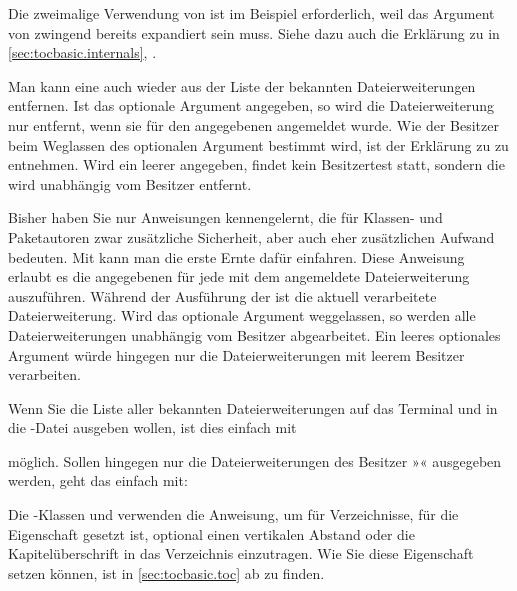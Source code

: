 Die zweimalige Verwendung von  ist im
Beispiel erforderlich, weil das Argument von
 zwingend bereits expandiert
sein muss. Siehe dazu auch die Erklärung zu
 in
\autoref{sec:tocbasic.internals},
.
%
\EndIndexGroup


\begin{Declaration}
\end{Declaration}
Man kann eine  auch wieder aus der Liste der bekannten
Dateierweiterungen entfernen. Ist das optionale Argument 
angegeben, so wird die Dateierweiterung nur entfernt, wenn sie für den
angegebenen  angemeldet wurde. Wie der Besitzer beim Weglassen
des optionalen Argument bestimmt wird, ist der Erklärung zu
 zu entnehmen. Wird ein leerer
 angegeben, findet kein Besitzertest statt, sondern die
 wird unabhängig vom Besitzer entfernt.%
\EndIndexGroup


\begin{Declaration}
\end{Declaration}
Bisher haben Sie nur Anweisungen kennengelernt, die für Klassen- und
Paketautoren zwar zusätzliche Sicherheit, aber auch eher zusätzlichen Aufwand
bedeuten. Mit  kann man die erste Ernte dafür
einfahren. Diese Anweisung erlaubt es die angegebenen  für
jede mit dem  angemeldete Dateierweiterung
auszuführen. Während der Ausführung der  ist
 die aktuell
verarbeitete Dateierweiterung. Wird das optionale Argument
 weggelassen, so werden alle Dateierweiterungen
unabhängig vom Besitzer abgearbeitet. Ein leeres optionales Argument würde
hingegen nur die Dateierweiterungen mit leerem Besitzer verarbeiten.
\begin{Example}
  Wenn Sie die Liste aller bekannten Dateierweiterungen auf das Terminal und
  in die -Datei ausgeben wollen, ist dies einfach mit
\begin{lstcode}
  \doforeachtocfile{\typeout{\@currext}}
\end{lstcode}
  möglich. Sollen hingegen nur die Dateierweiterungen des Besitzer
  »« ausgegeben werden, geht das einfach mit:
\begin{lstcode}
  \doforeachtocfile[foo]{\typeout{\@currext}}
\end{lstcode}
\end{Example}
Die \KOMAScript-Klassen  und  verwenden die
Anweisung, um für Verzeichnisse, für die Eigenschaft 
gesetzt ist, optional einen vertikalen Abstand oder die Kapitelüberschrift in
das Verzeichnis einzutragen. Wie Sie diese Eigenschaft setzen können, ist
in \autoref{sec:tocbasic.toc} ab  zu
finden.%
\EndIndexGroup


